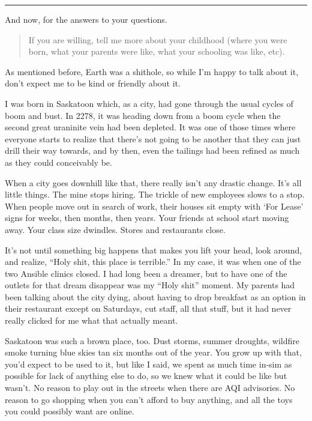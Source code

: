 \vspace{0.7cm}

\begin{center}\rule{0.5\linewidth}{0.5pt}\end{center}

\newpage

\noindent And now, for the answers to your questions.

\begin{quote}
If you are willing, tell me more about your childhood (where you were born, what your parents were like, what your schooling was like, etc).
\end{quote}

\noindent As mentioned before, Earth was a shithole, so while I'm happy to talk about it, don't expect me to be kind or friendly about it.

I was born in Saskatoon which, as a city, had gone through the usual cycles of boom and bust. In 2278, it was heading down from a boom cycle when the second great uraninite vein had been depleted. It was one of those times where everyone starts to realize that there's not going to be another that they can just drill their way towards, and by then, even the tailings had been refined as much as they could conceivably be.

When a city goes downhill like that, there really isn't any drastic change. It's all little things. The mine stops hiring. The trickle of new employees slows to a stop. When people move out in search of work, their houses sit empty with `For Lease' signs for weeks, then months, then years. Your friends at school start moving away. Your class size dwindles. Stores and restaurants close.

It's not until something big happens that makes you lift your head, look around, and realize, ``Holy shit, this place is terrible.'' In my case, it was when one of the two Ansible clinics closed. I had long been a dreamer, but to have one of the outlets for that dream disappear was my ``Holy shit'' moment. My parents had been talking about the city dying, about having to drop breakfast as an option in their restaurant except on Saturdays, cut staff, all that stuff, but it had never really clicked for me what that actually meant.

Saskatoon was such a brown place, too. Dust storms, summer droughts, wildfire smoke turning blue skies tan six months out of the year. You grow up with that, you'd expect to be used to it, but like I said, we spent as much time in-sim as possible for lack of anything else to do, so we knew what it could be like but wasn't. No reason to play out in the streets when there are AQI advisories. No reason to go shopping when you can't afford to buy anything, and all the toys you could possibly want are online.

